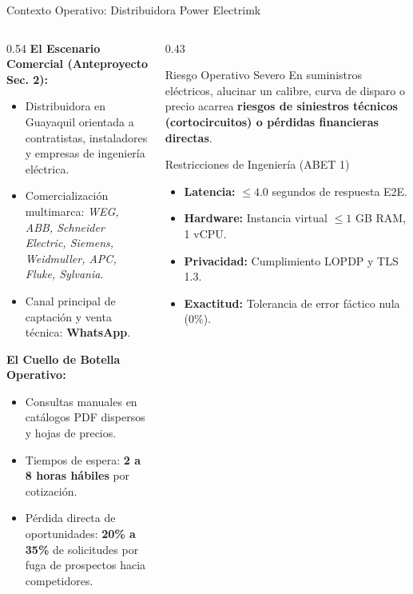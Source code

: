 \documentclass[aspectratio=169, 10pt]{beamer}
\begin{document}
\begin{frame}{Contexto Operativo: Distribuidora Power Electrimk}
  \begin{columns}
    \begin{column}{0.54\textwidth}
      \textbf{El Escenario Comercial (Anteproyecto Sec. 2):}
      \begin{itemize}\footnotesize\setlength{\itemsep}{2pt}
        \item Distribuidora en Guayaquil orientada a contratistas, instaladores y empresas de ingeniería eléctrica.
        \item Comercialización multimarca: \textit{WEG, ABB, Schneider Electric, Siemens, Weidmuller, APC, Fluke, Sylvania}.
        \item Canal principal de captación y venta técnica: \textbf{WhatsApp}.
      \end{itemize}
      
      \vspace{0.15cm}
      \textbf{El Cuello de Botella Operativo:}
      \begin{itemize}\footnotesize\setlength{\itemsep}{2pt}
        \item Consultas manuales en catálogos PDF dispersos y hojas de precios.
        \item Tiempos de espera: \textbf{2 a 8 horas hábiles} por cotización.
        \item Pérdida directa de oportunidades: \textbf{20\% a 35\%} de solicitudes por fuga de prospectos hacia competidores.
      \end{itemize}
    \end{column}
    
    \begin{column}{0.43\textwidth}
      \begin{alertblock}{Riesgo Operativo Severo}
        \footnotesize
        En suministros eléctricos, alucinar un calibre, curva de disparo o precio acarrea \textbf{riesgos de siniestros técnicos (cortocircuitos) o pérdidas financieras directas}.
      \end{alertblock}
      
      \begin{block}{Restricciones de Ingeniería (ABET 1)}
        \scriptsize
        \begin{itemize}\setlength{\itemsep}{1pt}
          \item \textbf{Latencia:} $\le 4.0$ segundos de respuesta E2E.
          \item \textbf{Hardware:} Instancia virtual $\le 1$ GB RAM, 1 vCPU.
          \item \textbf{Privacidad:} Cumplimiento LOPDP y TLS 1.3.
          \item \textbf{Exactitud:} Tolerancia de error fáctico nula (0\%).
        \end{itemize}
      \end{block}
    \end{column}
  \end{columns}
\end{frame}
\end{document}
